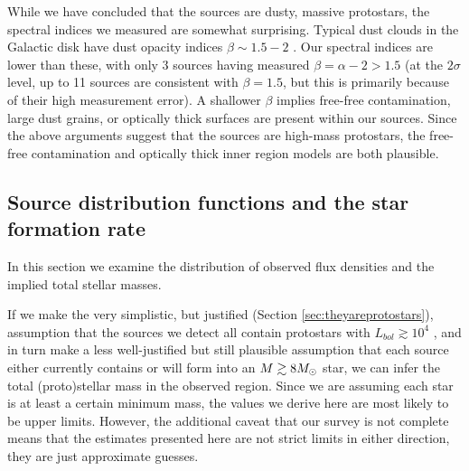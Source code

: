 \documentclass[twocolumn]{aastex61}
\begin{document}
While we have concluded that the sources are dusty, massive protostars, the
spectral indices we measured are somewhat surprising.  Typical dust clouds in
the Galactic disk have dust opacity indices $\beta\sim1.5-2$
\citep{Schnee2010a,Shirley2011a,Sadavoy2016a}.  Our spectral indices are lower
than these, with only 3 sources having measured $\beta=\alpha-2 > 1.5$ (at the
$2\sigma$ level, up to 11 sources are consistent with $\beta=1.5$, but this is
primarily because of their high measurement error).  A shallower $\beta$
implies free-free contamination, large dust grains, or optically thick surfaces
are present within our sources.  Since the above arguments suggest that the
sources are high-mass protostars, the free-free contamination and optically
thick inner region models are both plausible.

\subsection{Source distribution functions and the star formation rate}
\label{sec:distributionsandsfr}

In this section we examine the distribution of observed flux densities and the
implied total stellar masses.  


If we make the very simplistic, but justified (Section
\ref{sec:theyareprotostars}), assumption that the sources we
detect all contain protostars with $L_{bol}\gtrsim10^4$ \lsun, and in turn make
a less well-justified but still plausible assumption that each source either
currently contains or will form into an $M\gtrsim8 M_{\odot}$ star, we can infer
the total (proto)stellar mass in the observed region.  Since we are assuming
each star is at least a certain minimum mass, the values we derive here are
most likely to be upper limits.  However, the additional caveat
that our survey is not complete means that the estimates presented here are not
strict limits in either direction, they are just approximate guesses.
\end{document}
